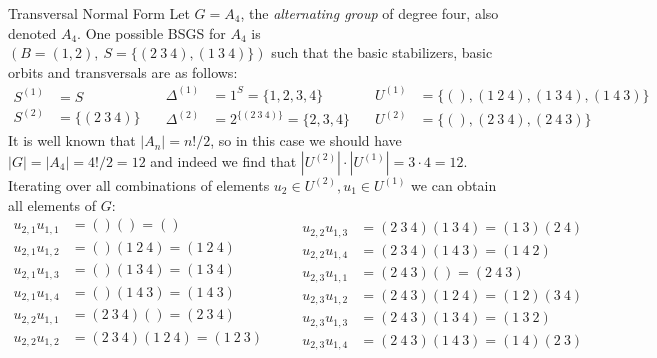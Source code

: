 \begin{exmp}[label=exmp:transversal_normal_form]{Transversal Normal Form}
  Let $G = A_4$, the \textit{alternating group} of degree four, also denoted
  $A_4$. One possible BSGS for $A_4$ is $(B = (1, 2),\ S = \{(2\ 3\ 4), (1\ 3\
  4)\})$ such that the basic stabilizers, basic orbits and transversals are as
  follows:
  \footnotesize
  \begin{equation*}
    \begin{split}
      S^{(1)} &= S \\
      S^{(2)} &= \{(2\ 3\ 4)\}
    \end{split}
    \quad
    \begin{split}
      \Delta^{(1)} &= 1^S = \{1, 2, 3, 4\} \\
      \Delta^{(2)} &= 2^{\{(2\ 3\ 4)\}} = \{2, 3, 4\}
    \end{split}
    \quad
    \begin{split}
      U^{(1)} &= \{(),(1\ 2\ 4),(1\ 3\ 4),(1\ 4\ 3)\} \\
      U^{(2)} &= \{(),(2\ 3\ 4),(2\ 4\ 3)\}
    \end{split}
  \end{equation*}
  \normalsize
  It is well known that $|A_n| = n! / 2$, so in this case we should
  have $|G| = |A_4| = 4! / 2 = 12$ and indeed we find that
  $|U^{(2)}| \cdot |U^{(1)}| = 3 \cdot 4 = 12$.
  Iterating over all combinations of elements $u_2 \in U^{(2)}, u_1 \in U^{(1)}$
  we can obtain all elements of $G$:
  \footnotesize
  \begin{equation*}
    \begin{split}
      u_{2,1} u_{1,1} &= () ()               = () \\
      u_{2,1} u_{1,2} &= () (1\ 2\ 4)        = (1\ 2\ 4) \\
      u_{2,1} u_{1,3} &= () (1\ 3\ 4)        = (1\ 3\ 4) \\
      u_{2,1} u_{1,4} &= () (1\ 4\ 3)        = (1\ 4\ 3) \\
      u_{2,2} u_{1,1} &= (2\ 3\ 4) ()        = (2\ 3\ 4) \\
      u_{2,2} u_{1,2} &= (2\ 3\ 4) (1\ 2\ 4) = (1\ 2\ 3) \\
    \end{split}
    \qquad
    \begin{split}
      u_{2,2} u_{1,3} &= (2\ 3\ 4) (1\ 3\ 4) = (1\ 3)(2\ 4) \\
      u_{2,2} u_{1,4} &= (2\ 3\ 4) (1\ 4\ 3) = (1\ 4\ 2) \\
      u_{2,3} u_{1,1} &= (2\ 4\ 3) ()        = (2\ 4\ 3) \\
      u_{2,3} u_{1,2} &= (2\ 4\ 3) (1\ 2\ 4) = (1\ 2)(3\ 4) \\
      u_{2,3} u_{1,3} &= (2\ 4\ 3) (1\ 3\ 4) = (1\ 3\ 2) \\
      u_{2,3} u_{1,4} &= (2\ 4\ 3) (1\ 4\ 3) = (1\ 4)(2\ 3)
    \end{split}
  \end{equation*}
  \normalsize
\end{exmp}
